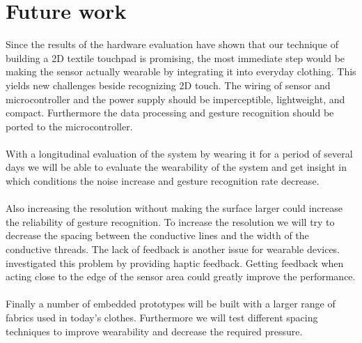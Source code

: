 \section{Future work}
\label{summaryandfuturework.futurework}
Since the results of the hardware evaluation have shown that our technique of building a 2D textile touchpad is promising, the most immediate step would  be making the sensor actually wearable by integrating it into everyday clothing. This yields new challenges beside recognizing 2D touch. The wiring of sensor and microcontroller and the power supply should be imperceptible, lightweight, and compact. Furthermore the data processing and gesture recognition should be ported to the microcontroller. 
\\ \\
With a longitudinal evaluation of the system by wearing it for a period of several days we will be able to evaluate the wearability of the system and get insight in which conditions the noise increase and gesture recognition rate decrease.
\\ \\
Also increasing the resolution without making the surface larger could increase the reliability of gesture recognition. To increase the resolution we will try to decrease the spacing between the conductive lines and the width of the conductive threads. The lack of feedback is another issue for wearable devices. \cite{6636291} investigated this problem by providing haptic feedback. Getting feedback when acting close to the edge of the sensor area could greatly improve the performance. 
\\ \\
Finally a number of embedded prototypes will be built with a larger range of fabrics used in today's clothes. Furthermore we will test different spacing techniques to improve wearability and decrease the required pressure. 
